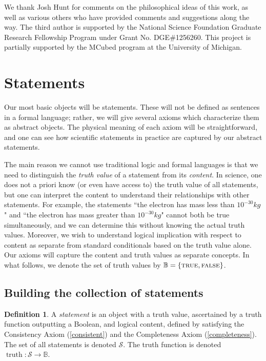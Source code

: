 \documentclass[psamsfonts]{amsart}
\theoremstyle{definition}
\newtheorem{defn}[thm]{Definition}
\theoremstyle{remark}
\numberwithin{equation}{section}
\DeclareMathOperator{\truth}{truth}
\def\TRUE{\textsc{true}}
\def\FALSE{\textsc{false}}
\begin{document}
 We thank Josh Hunt for comments on the philosophical ideas of this work, as well as various others who have provided comments and suggestions along the way. The third author is supported by the National Science Foundation Graduate Research Fellowship Program under Grant No. DGE\#1256260. This project is partially supported by the MCubed program at the University of Michigan. 


\section{Statements}
\label{statements}

Our most basic objects will be statements. These will not be defined as sentences in a formal language; rather, we will give several axioms which characterize them as abstract objects. The physical meaning of each axiom will be straightforward, and one can see how scientific statements in practice are captured by our abstract statements.

The main reason we cannot use traditional logic and formal languages is that we need to distinguish the \emph{truth value} of a statement from its \emph{content}. In science, one does not a priori know (or even have access to) the truth value of all statements, but one can interpret the content to understand their relationships with other statements. For example, the statements ``the electron has mass less than $10^{-30}kg$" and ``the electron has mass greater than $10^{-30}kg$" cannot both be true simultaneously, and we can determine this without knowing the actual truth values. Moreover, we wish to understand logical implication with respect to content as separate from standard conditionals based on the truth value alone. Our axioms will capture the content and truth values as separate concepts. In what follows, we denote the set of truth values by $\mathbb{B} = \{\TRUE,\FALSE\}$. 

\subsection{Building the collection of statements}

\begin{defn}
A \emph{statement} is an object with a truth value, ascertained by a truth function outputting a Boolean, and logical content, defined by satisfying the Consistency Axiom (\ref{consistent}) and the Completeness Axiom (\ref{completeness}). The set of all statements is denoted $\mathcal{S}$. The truth function is denoted $\truth:\mathcal{S}\to\mathbb{B}$.
\end{defn}
\end{document}

